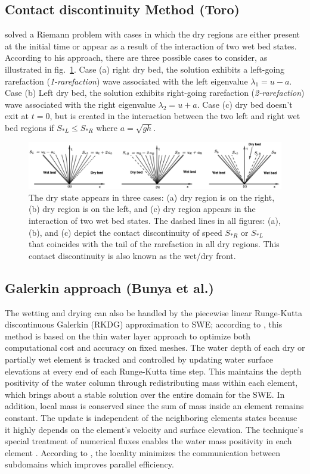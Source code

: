\documentclass[10pt,a4paper]{article}
\begin{document}
	\subsection{Contact discontinuity  Method (Toro)}
	\citet{toro2001shock} solved a Riemann problem with cases in which the dry regions are either present at the initial time or appear as a result of the interaction of two wet bed states. According to his approach, there are three possible cases to consider, as illustrated in fig.~\ref{fig:dry-wet}. Case (a) right dry bed, the solution exhibits a left-going rarefaction ({\em 1-rarefaction}) wave associated with the left eigenvalue $\lambda_1 = u - a$. Case (b) Left dry bed, the solution exhibits right-going rarefaction ({\em 2-rarefaction}) wave associated with the right eigenvalue $\lambda_2 = u + a$. Case (c) dry bed doesn't exit at $t=0$, but is created in the interaction between the two left and right wet bed regions if $S_{*L} \le S_{*R}$ where $a = \sqrt{gh}$.
		\begin{figure}[H]
		\centering
		\includegraphics[width=.9\linewidth]{images/dry-wet}
		\caption{The dry state appears in three cases: (a) dry region is on the right, (b) dry region is on the left, and (c) dry region appears in the interaction of two wet bed states. The dashed lines in all figures: (a), (b), and (c) depict the contact discontinuity of speed $S_{*R}$ or $S_{*L}$ that coincides with the tail of the rarefaction in all dry regions. This contact discontinuity is also known as the wet/dry front.}
		\label{fig:dry-wet}
	\end{figure}
	


	\subsection{Galerkin approach (Bunya et al.)}  
		The wetting and drying can also be handled by the piecewise linear Runge-Kutta discontinuous Galerkin (RKDG)  approximation  to SWE;  according to \citet{bu-ku-we-da:2009}, this method is based on the thin water layer approach to optimize both computational cost and accuracy on fixed meshes. The water depth of each dry or partially wet element is tracked and controlled by updating water surface elevations at every end of each Runge-Kutta time step. This maintains the depth positivity of the water column through redistributing mass within each element, which brings about a stable solution over the entire domain for the SWE. In addition, local mass is conserved since the sum of mass inside an element remains constant. The update is independent of the neighboring elements states because it highly depends on the element's velocity and surface elevation. The technique's special treatment of numerical fluxes enables the water mass positivity in each element \cite{bu-ku-we-da:2009,kubatko2007semi}. According to \citet{bokhove2005flooding,bu-ku-we-da:2009}, the locality minimizes the communication between subdomains which improves parallel efficiency. 
\end{document}
